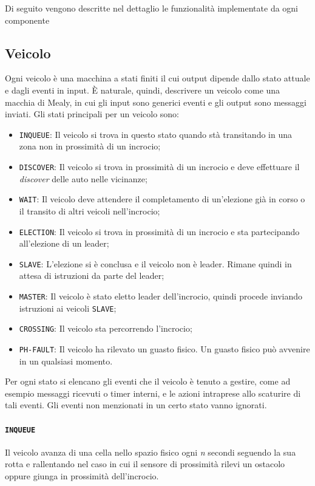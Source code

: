 \documentclass{memoir}
\begin{document}
Di seguito vengono descritte nel dettaglio le funzionalità implementate da ogni componente
\subsection{Veicolo}
Ogni veicolo è una macchina a stati finiti il cui output dipende dallo stato
attuale e dagli eventi in input. È naturale, quindi, descrivere un veicolo come
una macchia di Mealy, in cui gli input sono generici eventi e gli output sono
messaggi inviati. Gli stati principali per un veicolo sono:
\begin{itemize}
\item \texttt{INQUEUE}: Il veicolo si trova in questo stato quando stà
  transitando in una zona non in prossimità di un incrocio;
\item \texttt{DISCOVER}: Il veicolo si trova in prossimità di un incrocio e deve
  effettuare il \emph{discover} delle auto nelle vicinanze;
\item \texttt{WAIT}: Il veicolo deve attendere il completamento di un'elezione
  già in corso o il transito di altri veicoli nell'incrocio;
\item \texttt{ELECTION}: Il veicolo si trova in prossimità di un incrocio e sta
  partecipando all'elezione di un leader;
\item \texttt{SLAVE}: L'elezione si è conclusa e il veicolo non è leader. Rimane
  quindi in attesa di istruzioni da parte del leader;
\item \texttt{MASTER}: Il veicolo è stato eletto leader dell'incrocio, quindi
  procede inviando istruzioni ai veicoli \texttt{SLAVE};
\item \texttt{CROSSING}: Il veicolo sta percorrendo l'incrocio;
\item \texttt{PH-FAULT}: Il veicolo ha rilevato un guasto fisico. Un guasto
  fisico può avvenire in un qualsiasi momento.
\end{itemize}

Per ogni stato si elencano gli eventi che il veicolo è tenuto a gestire, come ad
esempio messaggi ricevuti o timer interni, e le azioni intraprese allo scaturire
di tali eventi. Gli eventi non menzionati in un certo stato vanno ignorati.

\paragraph{\texttt{INQUEUE}}
Il veicolo avanza di una cella nello spazio fisico ogni \emph{n} secondi
seguendo la sua rotta e rallentando nel caso in cui il sensore di prossimità
rilevi un ostacolo oppure giunga in prossimità dell'incrocio.
\end{document}
